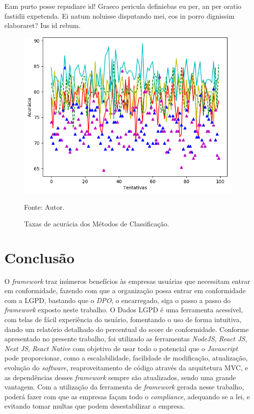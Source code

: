 \documentclass[
	12pt,				%
	openright,			%
	oneside,			%
	a4paper,			%
	english,			%
	french,				%
	spanish,			%
	brazil,				%
	]{abntex2}
\begin{document}
Eam purto posse repudiare id! Graeco pericula definiebas eu per, an per oratio fastidii expetenda. Ei natum noluisse disputando mei, eos in porro dignissim elaboraret? Ius id rebum.
\begin{figure}[ht]
    \centering
    \caption{Taxas de acurácia dos Métodos de Classificação.}
    \includegraphics[width=5.0in]{Images/acc-classification.png}
    \label{fig: grafico-acc}
    
    \centering \small Fonte: Autor.
\end{figure}

 \chapter{Conclusão}
 \label{ch: conclusao}
 O \textit{framework} traz inúmeros benefícios às empresas usuárias que necessitam entrar em conformidade, fazendo com que a organização possa entrar em conformidade com a LGPD, bastando que o \textit{DPO}, o encarregado, siga o passo a passo do \textit{framework} exposto neste trabalho. O Dados LGPD é uma ferramenta acessível, com telas de fácil experiência do usuário, fomentando o uso de forma intuitiva, dando um relatório detalhado do percentual do score de conformidade. Conforme apresentado no presente trabalho, foi utilizado as ferramentas \textit{NodeJS}, \textit{React JS}, \textit{Next JS}, \textit{React Native} com objetivo de usar todo o potencial que o \textit{Javascript} pode proporcionar, como a escalabilidade, facilidade de modificação, atualização, evolução do \textit{software}, reaproveitamento de código através da arquitetura MVC, e as dependências desses \textit{framework} sempre são atualizados, sendo uma grande vantagem. Com a utilização da ferramenta de \textit{framework} gerada nesse trabalho, poderá fazer com que as empresas façam todo o \textit{compliance}, adequando se a lei, e evitando tomar multas que podem desestabilizar a empresa.
\end{document}
